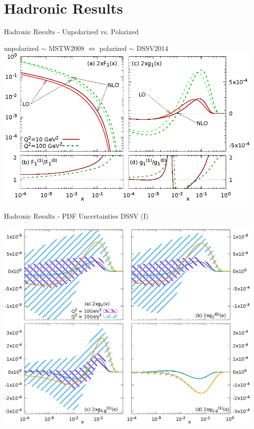 \section{Hadronic Results}
\begin{frame}{Hadronic Results - Unpolarized vs. Polarized}
\begin{center}
unpolarized $\sim$ MSTW2008 $\Leftrightarrow$ polarized $\sim$ DSSV2014\quad\,\,\,
\includegraphics[width=.8\textwidth]{img/F1g1}
\end{center}
\end{frame}

\begin{frame}{Hadronic Results - PDF Uncertainties DSSV (I)}
\begin{center}
\includegraphics[height=.95\textheight]{img/g1Parts-pdf}
\end{center}
\end{frame}


